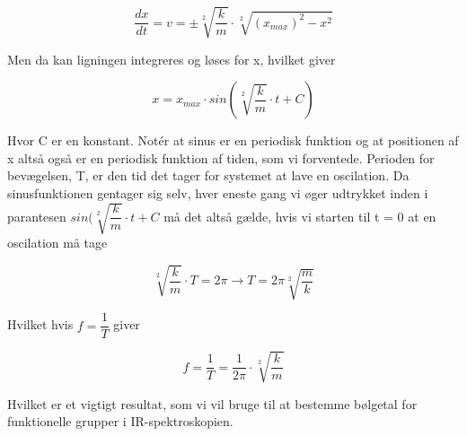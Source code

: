 \begin{center}
\begin{equation}
\dfrac{dx}{dt} = v = \pm \sqrt[2]{\dfrac{k}{m}} \cdot \sqrt[2]{(x_{max})^2-x^2}
\end{equation}
\end{center}

Men da kan ligningen integreres og løses for x, hvilket giver

\begin{center}
\begin{equation}
x = x_{max} \cdot sin(\sqrt[2]{\dfrac{k}{m}} \cdot t + C)
\end{equation}
\end{center}
\bigskip
Hvor C er en konstant. Notér at sinus er en periodisk funktion og at positionen af x altså også er en periodisk funktion af tiden, som vi forventede. Perioden for bevægelsen, T, er den tid det tager for systemet at lave en oscilation. Da sinusfunktionen gentager sig selv, hver eneste gang vi øger udtrykket inden i parantesen $sin(\sqrt[2]{\dfrac{k}{m}} \cdot t + C$ må det altså gælde, hvis vi starten til t = 0 at en oscilation må tage

\begin{center}
\begin{equation}
\sqrt[2]{\dfrac{k}{m}} \cdot T = 2 \pi \rightarrow T = 2 \pi \sqrt[2]{\dfrac{m}{k}}
\end{equation}
\end{center}

Hvilket hvis $f = \dfrac{1}{T}$ giver

\begin{center}
\begin{equation}
f = \dfrac{1}{T} = \dfrac{1}{2 \pi} \cdot \sqrt[2]{\dfrac{k}{m}}
\end{equation}
\end{center}

Hvilket er et vigtigt resultat, som vi vil bruge til at bestemme bølgetal for funktionelle grupper i IR-spektroskopien. 
\pagebreak